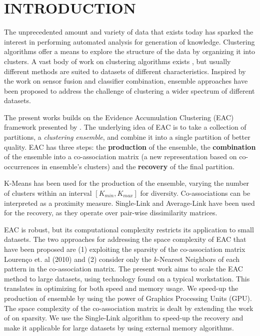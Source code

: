\section{\uppercase{Introduction}}
\label{sec:intro}


\noindent The unprecedented amount and variety of data that exists today has sparked the interest in performing automated analysis for generation of knowledge.
Clustering algorithms offer a means to explore the structure of the data by organizing it into clusters.
A vast body of work on clustering algorithms exists \cite{Jain2010}, but usually different methods are suited to datasets of different characteristics.
Inspired by the work on sensor fusion and classifier combination, ensemble approaches \cite{Fred2001,Strehl2002} have been proposed to address the challenge of clustering a wider spectrum of different datasets.

The present works builds on the Evidence Accumulation Clustering (EAC) framework presented by \cite{Fred2002,Fred2005}.
The underlying idea of EAC is to take a collection of partitions, a \emph{clustering ensemble}, and combine it into a single partition of better quality.
EAC has three steps:
the \textbf{production} of the ensemble,
the \textbf{combination} of the ensemble into a co-association matrix (a new representation based on co-occurrences in ensemble's clusters) and
the \textbf{recovery} of the final partition.

K-Means has been used for the production of the ensemble, varying the number of clusters within an interval $[K_{min}, K_{max}]$ for diversity.
Co-associations can be interpreted as a proximity measure.
Single-Link and Average-Link have been used for the recovery, as they operate over pair-wise dissimilarity matrices.

EAC is robust, but its computational complexity restricts its application to small datasets.
The two approaches for addressing the space complexity of EAC that have been proposed are (1) exploiting the sparsity of the co-association matrix Lourenço et. al (2010) and (2) consider only the $k$-Nearest Neighbors of each pattern in the co-association matrix.
The present work aims to scale the EAC method to large datasets, using technology found on a typical workstation.
This translates in optimizing for both speed and memory usage.
We speed-up the production of ensemble by using the power of Graphics Processing Units (GPU).
The space complexity of the co-association matrix is dealt by extending the work of \cite{Lourenco2010} on sparsity.
We use the Single-Link algorithm to speed-up the recovery and make it applicable for large datasets by using external memory algorithms.

